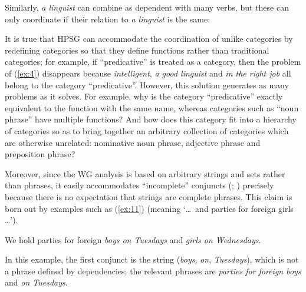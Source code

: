 \documentclass[output=paper
 	        ,biblatex
                ,babelshorthands
                ,newtxmath
                ,draftmode
                ,colorlinks, citecolor=brown
]{langscibook}
\begin{document}
\begin{exe}
	\label{ex:5}

	\label{ex:6}

	\label{ex:7}
\end{exe}

\noindent
Similarly, \emph{a linguist} can combine as dependent with many verbs, but these can only coordinate
if their relation to \emph{a linguist} is the same:

\begin{exe}
	\label{ex:8}

	\label{ex:9}

	\label{ex:10}
\end{exe}

\noindent
It is true that HPSG can accommodate the coordination of unlike categories by redefining categories
so that they define functions rather than traditional categories; for example, if ``predicative'' is
treated as a category, then the problem of (\ref{ex:4}) disappears because \emph{intelligent},
\emph{a good linguist} and \emph{in the right job} all belong to the category
``predicative''. However, this solution generates as many problems as it solves. For example, why is
the category ``predicative'' exactly equivalent to the function with the same name, whereas
categories such as ``noun phrase'' have multiple functions? And how does this category fit into a
hierarchy of categories so as to bring together an arbitrary collection of categories which are
otherwise unrelated: nominative noun phrase, adjective phrase and preposition phrase?

Moreover, since the WG analysis is based on arbitrary strings and sets rather than phrases, it
easily accommodates ``incomplete'' conjuncts (\citealt[405]{Hudson90a-u}; \citealt{Hudson1982})
precisely because there is no expectation that strings are complete phrases. This claim is born out
by examples such as (\ref{ex:11}) (meaning `\dots\ and parties for foreign girls \dots').

\begin{exe}
	\ex \label{ex:11} We hold parties for foreign \emph{boys on Tuesdays} and \emph{girls on Wednesdays}.
\end{exe}
In this example, the first conjunct is the string (\emph{boys}, \emph{on}, \emph{Tuesdays}), which
is not a phrase defined by dependencies; the relevant phrases are \emph{parties for foreign boys}
and \emph{on Tuesdays}.
\end{document}
